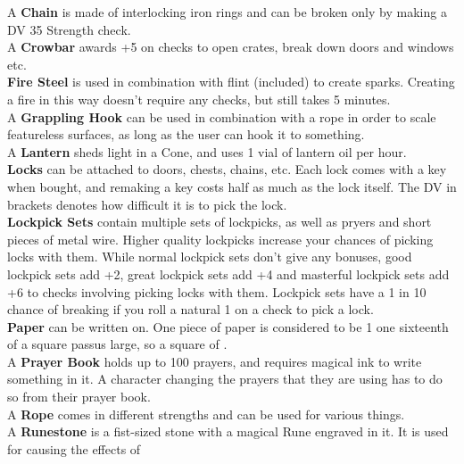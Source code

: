A \textbf{Chain} is made of interlocking iron rings and can be broken only by making a DV 35 Strength check.\\

A \textbf{Crowbar} awards +5 on checks to open crates, break down doors and windows etc.\\

\textbf{Fire Steel} is used in combination with flint (included) to create sparks.
Creating a fire in this way doesn't require any checks, but still takes 5 minutes.\\

A \textbf{Grappling Hook} can be used in combination with a rope in order to scale featureless surfaces, as long as the user can hook it to something.\\

A \textbf{Lantern} sheds light in a  Cone, and uses 1 vial of lantern oil per hour.\\

\textbf{Locks} can be attached to doors, chests, chains, etc.
Each lock comes with a key when bought, and remaking a key costs half as much as the lock itself.
The DV in brackets denotes how difficult it is to pick the lock.\\

\textbf{Lockpick Sets} contain multiple sets of lockpicks, as well as pryers and short pieces of metal wire.
Higher quality lockpicks increase your chances of picking locks with them.
While normal lockpick sets don't give any bonuses, good lockpick sets add +2, great lockpick sets add +4 and masterful lockpick sets add +6 to checks involving picking locks with them.
Lockpick sets have a 1 in 10 chance of breaking if you roll a natural 1 on a check to pick a lock.\\

\textbf{Paper} can be written on.
One piece of paper is considered to be 1 one sixteenth of a square passus large, so a square of  .\\

A \textbf{Prayer Book} holds up to 100 prayers, and requires magical ink to write something in it.
A character changing the prayers that they are using has to do so from their prayer book.\\

A \textbf{Rope} comes in different strengths and can be used for various things.\\

A \textbf{Runestone} is a fist-sized stone with a magical Rune engraved in it. 
It is used for causing the effects of~

